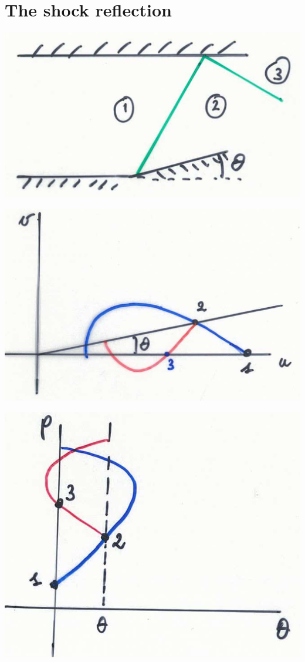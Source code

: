 \section{The shock reflection}
\begin{center}
\begin{minipage}{0.33\textwidth}
\includegraphics[scale=0.3]{ch9/5}
\end{minipage}
\begin{minipage}{0.35\textwidth}
\includegraphics[scale=0.25]{ch9/6}
\end{minipage}
\begin{minipage}{0.25\textwidth}
\includegraphics[scale=0.22]{ch9/7}

\end{minipage}
\end{center}
